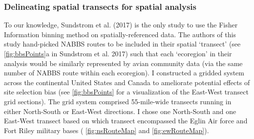 \documentclass[12pt,twoside]{reedthesis}
\begin{document}
\subsubsection{Delineating spatial transects for spatial
analysis}\label{delineating-spatial-transects-for-spatial-analysis}

To our knowledge, Sundstrom et al. (2017) is the only study to use the
Fisher Information binning method on spatially-referenced data. The
authors of this study hand-picked NABBS routes to be included in their
spatial `transect' (see \ref{fig:bbsPoints}a in Sundstrom et al. 2017)
such that each `ecoregion' in their analysis would be similarly
represented by avian community data (via the same number of NABBS route
within each ecoregion). I constructed a gridded system across the
continental United States and Canada to ameliorate potential effects of
site selection bias (see \ref{fig:bbsPoints} for a visualization of the
East-West transect grid sections). The grid system comprised
55-mile-wide transects running in either North-South or East-West
directions. I chose one North-South and one East-West transect based on
which transect encompassed the Eglin Air force and Fort Riley military
bases ( \ref{fig:nsRouteMap} and \ref{fig:ewRouteMap}).
\end{document}
